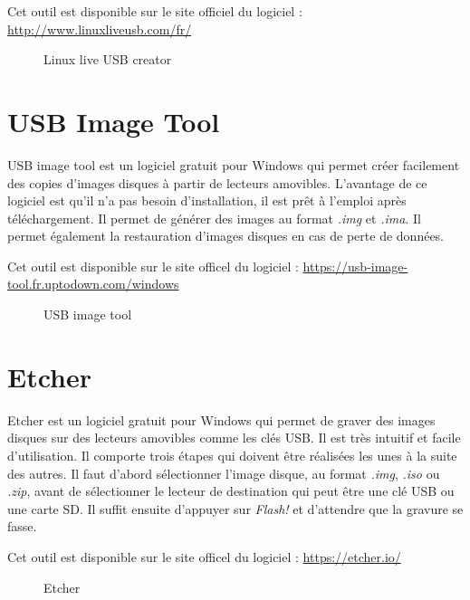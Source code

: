 \documentclass[final]{polytech/polytech}
\begin{document}
Cet outil est disponible sur le site officiel du logiciel :
\url{http://www.linuxliveusb.com/fr/}

\begin{figure}
	\caption{Linux live USB creator}
	\label{fig:lili_usb_creator}
\end{figure}

\vfill\eject

\section{USB Image Tool}
USB image tool est un logiciel gratuit pour Windows qui permet créer facilement des copies d'images disques à partir de lecteurs amovibles. L'avantage de ce logiciel est qu'il n'a pas besoin d'installation, il est prêt à l'emploi après téléchargement. Il permet de générer des images au format \textit{.img} et \textit{.ima}. Il permet également la restauration d'images disques en cas de perte de données.

Cet outil est disponible sur le site officel du logiciel :
\url{https://usb-image-tool.fr.uptodown.com/windows}

\begin{figure}
	\caption{USB image tool}
	\label{fig:usb_image_tool}
\end{figure}

\vfill\eject

\section{Etcher}
Etcher est un logiciel gratuit pour Windows qui permet de graver des images disques sur des lecteurs amovibles comme les clés USB. Il est très intuitif et facile d'utilisation. Il comporte trois étapes qui doivent être réalisées les unes à la suite des autres. Il faut d'abord sélectionner l'image disque, au format \textit{.img}, \textit{.iso} ou \textit{.zip}, avant de sélectionner le lecteur de destination qui peut être une clé USB ou une carte SD. Il suffit ensuite d'appuyer sur \textit{Flash!} et d'attendre que la gravure se fasse.

Cet outil est disponible sur le site officel du logiciel :
\url{https://etcher.io/}

\begin{figure}
	\caption{Etcher}
	\label{fig:etcher}
\end{figure}
\end{document}
